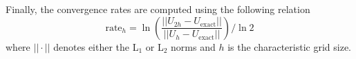 \documentclass[review,10pt]{elsarticle}
\newcommand{\tcr}[1]{\textcolor{red}{#1}}
\newcommand{\tcb}[1]{\textcolor{blue}{#1}}
\begin{document}
Finally, the convergence rates are computed using the following relation 
\begin{equation}
\label{eq:conv_rates}
\text{rate}_h = \ln \left( \frac{|| U_{2h}-U_{\text{exact}} ||}{|| U_{h}-U_{\text{exact}}|| } \right) / \ln 2
\end{equation}
where $|| \cdot ||$ denotes either the L$_1$ or L$_2$ norms and $h$ is the characteristic grid size.

\end{document}
